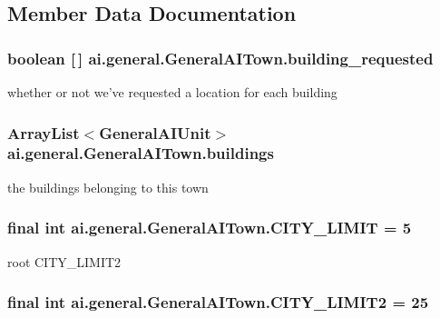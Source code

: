 \subsection{Member Data Documentation}
\hypertarget{classai_1_1general_1_1_general_a_i_town_aebbfac1a388c8f60bcbf1877d2e821f9}{
\subsubsection[{building\_\-requested}]{\setlength{\rightskip}{0pt plus 5cm}boolean \mbox{[}$\,$\mbox{]} {\bf ai.general.GeneralAITown.building\_\-requested}}}
\label{classai_1_1general_1_1_general_a_i_town_aebbfac1a388c8f60bcbf1877d2e821f9}
whether or not we've requested a location for each building \hypertarget{classai_1_1general_1_1_general_a_i_town_adc8c7f0186a5d950e42755cef386bdef}{
\subsubsection[{buildings}]{\setlength{\rightskip}{0pt plus 5cm}ArrayList$<${\bf GeneralAIUnit}$>$ {\bf ai.general.GeneralAITown.buildings}}}
\label{classai_1_1general_1_1_general_a_i_town_adc8c7f0186a5d950e42755cef386bdef}
the buildings belonging to this town \hypertarget{classai_1_1general_1_1_general_a_i_town_ac7e181c52b6489a74bb5d2e870629648}{
\subsubsection[{CITY\_\-LIMIT}]{\setlength{\rightskip}{0pt plus 5cm}final int {\bf ai.general.GeneralAITown.CITY\_\-LIMIT} = 5}}
\label{classai_1_1general_1_1_general_a_i_town_ac7e181c52b6489a74bb5d2e870629648}
root CITY\_\-LIMIT2 \hypertarget{classai_1_1general_1_1_general_a_i_town_a89768a3f505f2978a615031e26b3a936}{
\subsubsection[{CITY\_\-LIMIT2}]{\setlength{\rightskip}{0pt plus 5cm}final int {\bf ai.general.GeneralAITown.CITY\_\-LIMIT2} = 25}}
